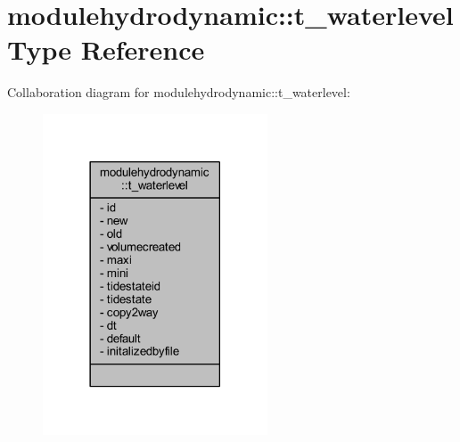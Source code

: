 \hypertarget{structmodulehydrodynamic_1_1t__waterlevel}{}\section{modulehydrodynamic\+:\+:t\+\_\+waterlevel Type Reference}
\label{structmodulehydrodynamic_1_1t__waterlevel}


Collaboration diagram for modulehydrodynamic\+:\+:t\+\_\+waterlevel\+:\nopagebreak
\begin{figure}[H]
\begin{center}
\leavevmode
\includegraphics[width=189pt]{structmodulehydrodynamic_1_1t__waterlevel__coll__graph}
\end{center}
\end{figure}
